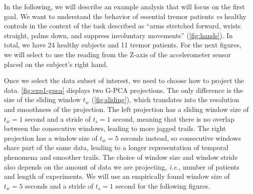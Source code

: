 In the following, we will describe an example analysis that will focus on the first goal. We want to understand the behavior of essential tremor patients \emph{vs} healthy controls in the context of the task described as ``arms stretched forward, wrists straight, palms down, and suppress involuntary movements'' (\cref{fig:hands}). In total, we have 24 healthy subjects and 11 tremor patients. For the next figures, we will select to use the reading from the Z-axis of the accelerometer sensor placed on the subject's right hand. 

Once we select the data subset of interest, we need to choose how to project the data. \cref{fig:exp1-gpca} displays two G-PCA projections. The only difference is the size of the sliding window $t_w$ (\cref{fig:sliding}), which translates into the resolution and smoothness of the projection. The left projection has a sliding window size of $t_w=1$ second and a stride of $t_s=1$ second, meaning that there is no overlap between the consecutive windows, leading to more jagged trails. The right projection has a window size of $t_w=5$ seconds instead, so consecutive windows share part of the same data, leading to a longer representation of temporal phenomena and smoother trails. The choice of window size and window stride also depends on the amount of data we are projecting, \emph{i.e.}, number of patients and length of experiments. We will use an empirically found window size of $t_w=5$ seconds and a stride of $t_s=1$ second for the following figures. 


